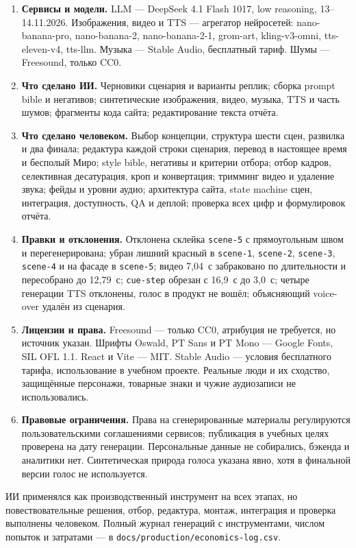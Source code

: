\documentclass[12pt, a4paper]{article}
\begin{document}
\begin{enumerate}
\setlength{\itemsep}{3pt}
    \item \textbf{Сервисы и модели.} LLM --- DeepSeek 4.1 Flash 1017, low reasoning, 13--14.11.2026. Изображения, видео и TTS --- агрегатор нейросетей: nano-banana-pro, nano-banana-2, nano-banana-2-1, grom-art, kling-v3-omni, tts-eleven-v4, tts-llm. Музыка --- Stable Audio, бесплатный тариф. Шумы --- Freesound, только CC0.
    \item \textbf{Что сделано ИИ.} Черновики сценария и варианты реплик; сборка prompt bible и негативов; синтетические изображения, видео, музыка, TTS и часть шумов; фрагменты кода сайта; редактирование текста отчёта.
    \item \textbf{Что сделано человеком.} Выбор концепции, структура шести сцен, развилка и два финала; редактура каждой строки сценария, перевод в настоящее время и бесполый Миро; style bible, негативы и критерии отбора; отбор кадров, селективная десатурация, кроп и конвертация; тримминг видео и удаление звука; фейды и уровни аудио; архитектура сайта, state machine сцен, интеграция, доступность, QA и деплой; проверка всех цифр и формулировок отчёта.
    \item \textbf{Правки и отклонения.} Отклонена склейка \texttt{scene-5} с прямоугольным швом и перегенерирована; убран лишний красный в \texttt{scene-1}, \texttt{scene-2}, \texttt{scene-3}, \texttt{scene-4} и на фасаде в \texttt{scene-5}; видео 7{,}04~с забраковано по длительности и пересобрано до 12{,}79~с; \texttt{cue-step} обрезан с 16{,}9~с до 3{,}0~с; четыре генерации TTS отклонены, голос в продукт не вошёл; объясняющий voice-over удалён из сценария.
    \item \textbf{Лицензии и права.} Freesound --- только CC0, атрибуция не требуется, но источник указан. Шрифты Oswald, PT Sans и PT Mono --- Google Fonts, SIL OFL 1.1. React и Vite --- MIT. Stable Audio --- условия бесплатного тарифа, использование в учебном проекте. Реальные люди и их сходство, защищённые персонажи, товарные знаки и чужие аудиозаписи не использовались.
    \item \textbf{Правовые ограничения.} Права на сгенерированные материалы регулируются пользовательскими соглашениями сервисов; публикация в учебных целях проверена на дату генерации. Персональные данные не собирались, бэкенда и аналитики нет. Синтетическая природа голоса указана явно, хотя в финальной версии голос не используется.
\end{enumerate}

ИИ применялся как производственный инструмент на всех этапах, но повествовательные решения, отбор, редактура, монтаж, интеграция и проверка выполнены человеком. Полный журнал генераций с инструментами, числом попыток и затратами --- в \texttt{docs/production/economics-log.csv}.
\end{document}
